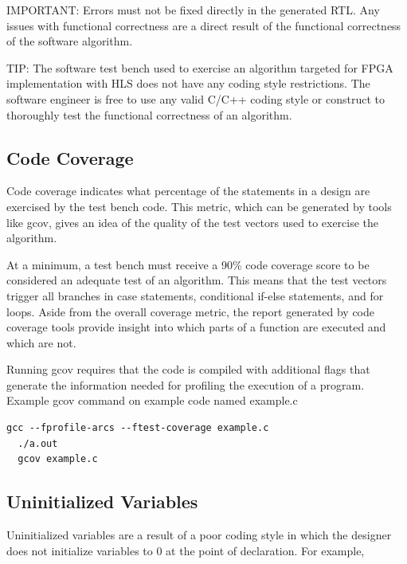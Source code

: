 \begin{highlight}
  IMPORTANT: Errors must not be fixed directly in the generated RTL. Any issues with functional
  correctness are a direct result of the functional correctness of the software algorithm.    
\end{highlight}


\begin{highlight}
  TIP: The software test bench used to exercise an algorithm targeted for FPGA implementation with HLS
  does not have any coding style restrictions. The software engineer is free to use any valid C/C++ coding
  style or construct to thoroughly test the functional correctness of an algorithm.    
\end{highlight}


\subsection{Code Coverage}

Code coverage indicates what percentage of the statements in a design are exercised by the
test bench code. This metric, which can be generated by tools like gcov, gives an idea of the
quality of the test vectors used to exercise the algorithm.

\par At a minimum, a test bench must receive a 90\% code coverage score to be considered an adequate test of an algorithm. This means that the test vectors trigger all branches in case statements, conditional if-else statements, and for loops. Aside from the overall coverage
metric, the report generated by code coverage tools provide insight into which parts of a function are executed and which are not.

Running gcov requires that the code is compiled with additional flags that generate the information needed for profiling the execution of a program. Example gcov command on example code named example.c

\begin{lstlisting}[style=CStyle]
  gcc --fprofile-arcs --ftest-coverage example.c
  ./a.out
  gcov example.c    
\end{lstlisting}

\subsection{Uninitialized Variables}
Uninitialized variables are a result of a poor coding style in which the designer does not initialize variables to 0 at the point of declaration. For example, 

